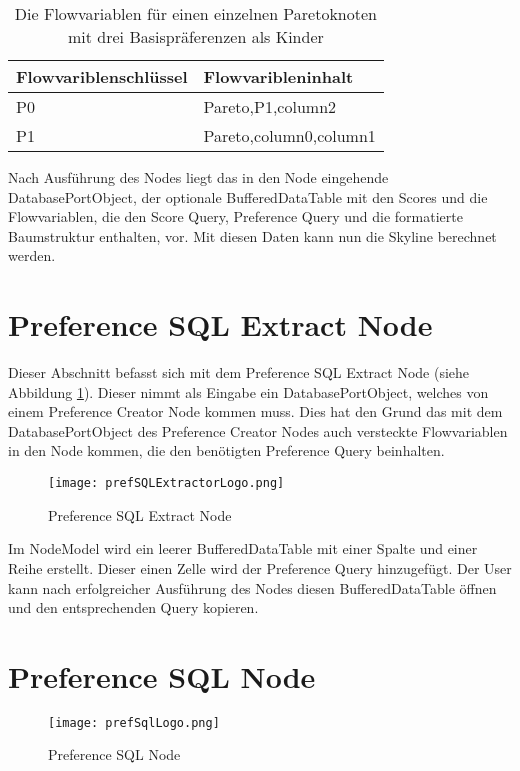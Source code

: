 \begin{table}[H]
  \centering
  \begin{tabular}{|M{4cm}|M{10cm}|}
    \hline   
    Flowvariblenschlüssel & Flowvaribleninhalt \\ \hline 
    P0 &  Pareto,P1,column2 \\ \hline
    P1 & Pareto,column0,column1\\ \hline
  \end{tabular}
  \newline\newline
  \caption{Die Flowvariablen für einen einzelnen Paretoknoten mit drei Basispräferenzen als Kinder}\label{tbl:threeChilds}
\end{table}

Nach Ausführung des Nodes liegt das in den Node eingehende DatabasePortObject, der optionale BufferedDataTable mit den Scores und die Flowvariablen, die den Score Query, Preference Query und die formatierte  Baumstruktur enthalten, vor.
Mit diesen Daten kann nun die Skyline berechnet werden.
\section{Preference SQL Extract Node}
\label{ch:Implementierung:sec:prefSQLExtract}
Dieser Abschnitt befasst sich mit dem Preference SQL Extract Node (siehe Abbildung \ref{img:prefSQLExtractorLogo}). Dieser nimmt als Eingabe ein DatabasePortObject, welches von einem Preference Creator Node kommen muss. Dies hat den Grund das mit dem DatabasePortObject des Preference Creator Nodes auch versteckte Flowvariablen in den Node kommen, die den benötigten Preference Query beinhalten.

\begin{figure}[H]
	\centering
	\texttt{[image: prefSQLExtractorLogo.png]}
	\caption{Preference SQL Extract Node}
	\label{img:prefSQLExtractorLogo}
\end{figure}

Im NodeModel wird ein leerer BufferedDataTable mit einer Spalte und einer Reihe erstellt. Dieser einen Zelle wird der Preference Query hinzugefügt. Der User kann nach erfolgreicher Ausführung des Nodes diesen BufferedDataTable öffnen und den entsprechenden Query kopieren.
\section{Preference SQL Node}
\label{ch:Implementierung:sec:prefSQL}
\begin{figure}[H]
	\centering
	\texttt{[image: prefSqlLogo.png]}
	\caption{Preference SQL Node}
	\label{img:prefSQLLogo}
\end{figure}

